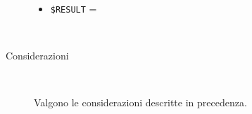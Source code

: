 \documentclass[../../SperimentazioniPratiche.tex]{subfiles}
\begin{document}
\begin{tcolorbox}[fonttitle=\bfseries, 
								adjusted title={\Large Prova 15B.1}, 
								breakable, 
								sharp corners=south,
								colback=white, 
								colframe=white!60!black]
\begin{description}[leftmargin=0.7cm,labelwidth=!]
\begin{description}
        					\item[\dispositivoC] \ \par
        					\begin{itemize}
        						\item \verb|$RESULT| = \ok
        					\end{itemize}
        					
        				\end{description}
        				
					\tcbline
        			
        			\item[Analisi risultati] \ \par
        				\begin{description}
        					\item[Considerazioni] \ \par
        						Valgono le considerazioni descritte in precedenza.
        				\end{description}        				
        				
				\end{description}  
				
			\end{tcolorbox}



	
	\newpage		
\end{document}
